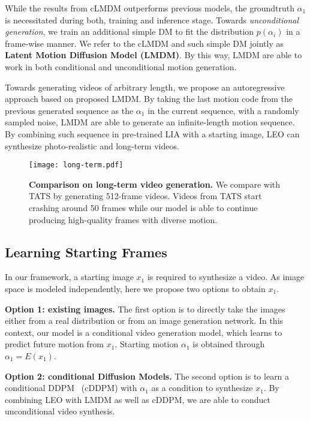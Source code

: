 {While the results from cLMDM outperforms previous models, the groundtruth $\alpha_1$ is necessitated during both, training and inference stage. Towards \textit{unconditional generation}, we train an additional simple DM to fit the distribution $p(\alpha_i)$ in a frame-wise manner. We refer to the cLMDM and such simple DM jointly as \textbf{Latent Motion Diffusion Model (LMDM)}. By this way, LMDM are able to work in both conditional and unconditional motion generation. 

Towards generating videos of arbitrary length, we propose an autoregressive approach based on proposed LMDM. By taking the last motion code from the previous generated sequence as the $\alpha_1$ in the current sequence, with a randomly sampled noise, LMDM are able to generate an infinite-length motion sequence. By combining such sequence in pre-trained LIA with a starting image, LEO can synthesize photo-realistic and long-term videos.

\begin{figure*}[t!]
\centering
\texttt{[image: long-term.pdf]}  
\caption{\textbf{Comparison on long-term video generation.} We compare with TATS by generating 512-frame videos. Videos from TATS start crashing around 50 frames while our model is able to continue producing high-quality frames with diverse motion.}
\label{fig:long-term}
\end{figure*}

\subsection{Learning Starting Frames}\label{sec:img-cond}
In our framework, a starting image $x_1$ is required to synthesize a video. As image space is modeled independently, here we propose two options to obtain $x_1$.

\textbf{Option 1: existing images.} The first option is to directly take the images either from a real distribution or from an image generation network. In this context, our model is a conditional video generation model, which learns to predict future motion from $x_1$. Starting motion $\alpha_1$ is obtained through $\alpha_1 = E(x_1)$.

\textbf{Option 2: conditional Diffusion Models.} The second option is to learn a conditional DDPM~\cite{ddpm} (cDDPM) with $\alpha_1$ as a condition to synthesize $x_1$. By combining LEO with LMDM as well as cDDPM, we are able to conduct unconditional video synthesis.

}
